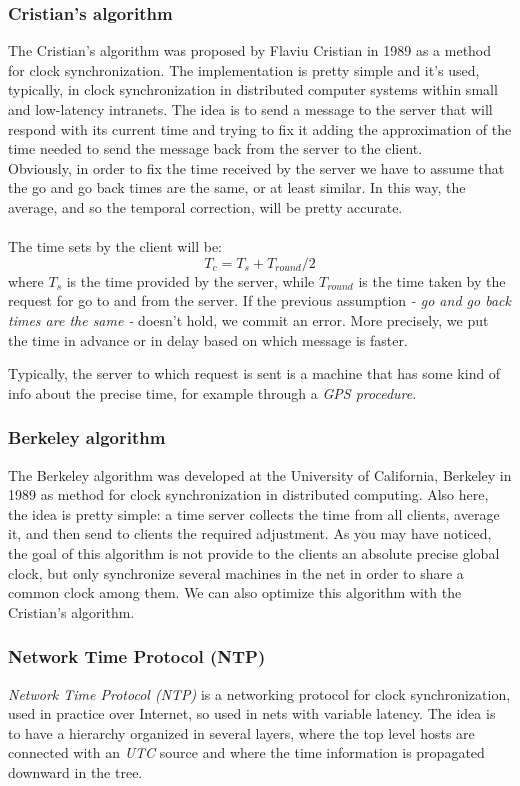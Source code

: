 \subsubsection{Cristian's algorithm}
The Cristian's algorithm was proposed by Flaviu Cristian in 1989 as a method for clock synchronization. The implementation is pretty simple and it's used, typically, in clock synchronization in distributed computer systems within small and low-latency intranets. The idea is to send a message to the server that will respond with its current time and trying to fix it adding the approximation of the time needed to send the message back from the server to the client.\\
Obviously, in order to fix the time received by the server we have to assume that the go and go back times are the same, or at least similar. In this way, the average, and so the temporal correction, will be pretty accurate.\\
\\
The time sets by the client will be:
\begin{equation*}
    T_c = T_s + T_{round} / 2
\end{equation*}
where $T_s$ is the time provided by the server, while $T_{round}$ is the time taken by the request for go to and from the server. If the previous assumption \textit{- go and go back times are the same -} doesn't hold, we commit an error. More precisely, we put the time in advance or in delay based on which message is faster.

Typically, the server to which request is sent is a machine that has some kind of info about the precise time, for example through a \textit{\textit{GPS procedure}}.

\subsubsection{Berkeley algorithm}
The Berkeley algorithm was developed at the University of California, Berkeley in 1989 as method for clock synchronization in distributed computing. Also here, the idea is pretty simple: a time server collects the time from all clients, average it, and then send to clients the required adjustment. As you may have noticed, the goal of this algorithm is not provide to the clients an absolute precise global clock, but only synchronize several machines in the net in order to share a common clock among them.
We can also optimize this algorithm with the Cristian's algorithm.

\subsubsection{Network Time Protocol (NTP)}
\textit{Network Time Protocol (NTP)} is a networking protocol for clock synchronization, used in practice over Internet, so used in nets with variable latency. The idea is to have a hierarchy organized in several layers, where the top level hosts are connected with an \textit{UTC} source and where the time information is propagated downward in the tree.

